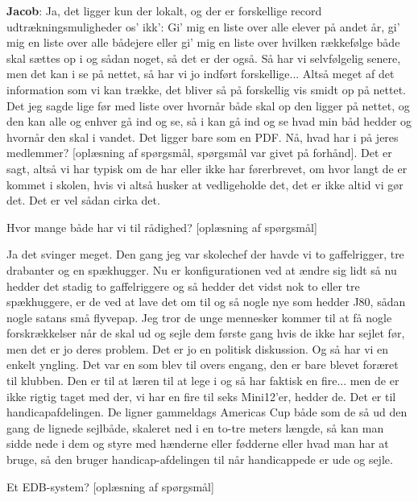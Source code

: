 \textbf{Jacob}: Ja, det ligger kun der lokalt, og der er forskellige record udtrækningsmuligheder os' ikk': Gi' mig en liste over alle elever på andet år, gi' mig en liste over alle bådejere eller gi' mig en liste over hvilken rækkefølge både skal sættes op i og sådan noget, så det er der også. 
Så har vi selvfølgelig senere, men det kan i se på nettet, så har vi jo indført forskellige... Altså meget af det information som vi kan trække, det bliver så på forskellig vis smidt op på nettet. 
Det jeg sagde lige før med liste over hvornår både skal op den ligger på nettet, og den kan alle og enhver gå ind og se, så i kan gå ind og se hvad min båd hedder og hvornår den skal i vandet. Det ligger bare som en PDF. 
Nå, hvad har i på jeres medlemmer? [oplæsning af spørgsmål, spørgsmål var givet på forhånd].
Det er sagt, altså vi har typisk om de har eller ikke har førerbrevet, om hvor langt de er kommet i skolen, hvis vi altså husker at vedligeholde det, det er ikke altid vi gør det. 
Det er vel sådan cirka det. 

Hvor mange både har vi til rådighed? [oplæsning af spørgsmål]

Ja det svinger meget. 
Den gang jeg var skolechef der havde vi to gaffelrigger, tre drabanter og en spækhugger. 
Nu er konfigurationen ved at ændre sig lidt så nu hedder det stadig to gaffelriggere og så hedder det vidst nok to eller tre spækhuggere, er de ved at lave det om til og så nogle nye som hedder J80, sådan nogle satans små flyvepap. 
Jeg tror de unge mennesker kommer til at få nogle forskrækkelser når de skal ud og sejle dem første gang hvis de ikke har sejlet før, men det er jo deres problem. 
Det er jo en politisk diskussion. 
Og så har vi en enkelt yngling. 
Det var en som blev til overs engang, den er bare blevet foræret til klubben. 
Den er til at læren til at lege i og så har faktisk en fire... men de er ikke rigtig taget med der, vi har en fire til seks Mini12'er, hedder de. 
Det er til handicapafdelingen. 
De ligner gammeldags Americas Cup både som de så ud den gang de lignede sejlbåde, skaleret ned i en to-tre meters længde, så kan man sidde nede i dem og styre med hænderne eller fødderne eller hvad man har at bruge, så den bruger handicap-afdelingen til når handicappede er ude og sejle. 

Et EDB-system? [oplæsning af spørgsmål]

